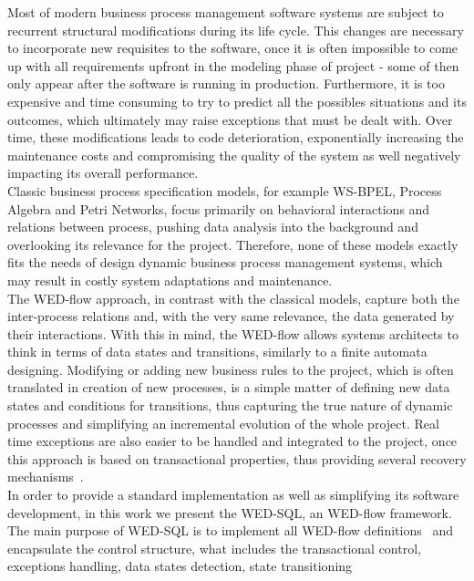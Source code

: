 \documentclass[conference]{IEEEtran}
\begin{document}
Most of modern business process management software systems are subject to recurrent structural modifications during its
life cycle. This changes are necessary to incorporate new requisites to the software, once it is often impossible 
to come up with all requirements upfront in the modeling phase of project - some of then only appear after the software
is running in production. Furthermore, it is too expensive and time consuming to try to predict all the possibles situations 
and its outcomes, which ultimately may raise exceptions that must be dealt with. Over time, these modifications leads
to code deterioration, exponentially increasing the maintenance costs and compromising the quality of the system as well 
negatively impacting its overall performance.
\\
\indent  Classic business process specification models, for example WS-BPEL, Process Algebra and Petri Networks, focus primarily
on behavioral interactions and relations between process, pushing data analysis into the background and overlooking its
relevance for the project. Therefore, none of these models exactly fits the needs of design dynamic business process 
management systems, which may result in costly system adaptations and maintenance.
\\
\indent  The WED-flow approach, in contrast with the classical models, capture both the inter-process relations and, with the very
same relevance, the data generated by their interactions. With this in mind, the WED-flow allows systems architects to 
think in terms of data states and transitions, similarly to a finite automata designing. Modifying or adding new business 
rules to the project, which is often translated in creation of new processes, is a simple matter of defining new data states 
and conditions for transitions, thus capturing the true nature of dynamic processes and simplifying an incremental evolution 
of the whole project. Real time exceptions are also easier to be handled and integrated to the project, once this approach
is based on transactional properties, thus providing several recovery mechanisms~\cite{ICWS12}.
\\
\indent In order to provide a standard implementation as well as simplifying its software development, in this work we present 
the WED-SQL, an WED-flow framework. The main purpose of WED-SQL is to implement all WED-flow definitions~\cite{FTPM10} and encapsulate 
the control structure, what includes the transactional control, exceptions handling, data states detection, state transitioning 
\end{document}
